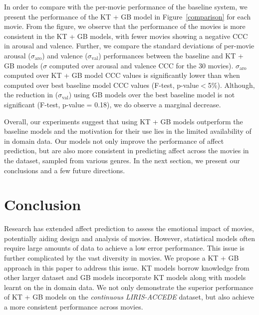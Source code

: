 \documentclass{article}
\begin{document}
\begin{spacing}{0.9}
In order to compare with the per-movie performance of the baseline system, we present the performance of the KT + GB model in Figure~\ref{comparison} for each movie.
From the figure, we observe that the performance of the movies is more consistent in the KT + GB models, with fewer movies showing a negative CCC in arousal and valence.
Further, we compare the standard deviations of per-movie arousal ($\sigma_\text{aro}$) and valence ($\sigma_\text{val}$) performances between the baseline and KT + GB models ($\sigma$ computed over arousal and valence CCC for the 30 movies). 
$\sigma_\text{aro}$ computed over KT + GB model CCC values is significantly lower than when computed over best baseline model CCC values (F-test, p-value$<$5\%). 
Although, the reduction in ($\sigma_\text{val}$) using GB models over the best baseline model is not significant (F-test, p-value = 0.18), we do observe a marginal decrease. 

Overall, our experiments suggest that using KT + GB models outperform the baseline models and the motivation for their use lies in the limited availability of in domain data.
Our models not only improve the performance of affect prediction, but are also more consistent in predicting affect across the movies in the dataset, sampled from various genres.
In the next section, we present our conclusions and a few future directions.

\vspace{-2mm}
\section{Conclusion}
\vspace{-2mm}

Research has extended affect prediction to assess the emotional impact of movies, potentially aiding design and analysis of movies.
However, statistical models often require large amounts of data to achieve a low error performance. 
This issue is further complicated by the vast diversity in movies.
We propose a KT + GB approach in this paper to address this issue.
KT models borrow knowledge from other larger dataset and GB models incorporate KT models along with models learnt on the in domain data. 
We not only demonstrate the superior performance of KT + GB models on the {\it continuous LIRIS-ACCEDE} dataset, but also achieve a more consistent performance across movies.


\end{spacing}
\end{document}
